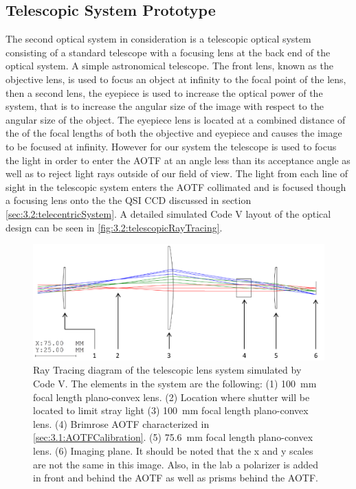 \subsection{Telescopic System Prototype}

The second optical system in consideration is a telescopic optical system consisting of a standard telescope with a focusing lens at the back end of the optical system. A simple astronomical telescope. The front lens, known as the objective lens, is used to focus an object at infinity to the focal point of the lens, then a second lens, the eyepiece is used to increase the optical power of the system, that is to increase the angular size of the image with respect to the angular size of the object. The eyepiece lens is located at a combined distance of the of the focal lengths of both the objective and eyepiece and causes the image to be focused at infinity. However for our system the telescope is used to focus the light in order to enter the AOTF at an angle less than its acceptance angle as well as to reject light rays outside of our field of view. The light from each line of sight in the telescopic system enters the AOTF collimated and is focused though a focusing lens onto the the QSI CCD discussed in section \autoref{sec:3.2:telecentricSystem}. A detailed simulated Code V layout of the optical design can be seen in \autoref{fig:3.2:telescopicRayTracing}.




\begin{figure}
    \includegraphics[width=1.0\textwidth]{./Images/3-2-TelescopicRayTracing.pdf}
    \caption[ALI Telescopic Design Prototype]{Ray Tracing diagram of the telescopic lens system simulated by Code V. The elements in the system are the following: (1) 100~mm focal length plano-convex lens. (2) Location where shutter will be located to limit stray light (3) 100~mm focal length plano-convex lens. (4) Brimrose AOTF characterized in \autoref{sec:3.1:AOTFCalibration}. (5) 75.6~mm focal length plano-convex lens. (6) Imaging plane. It should be noted that the x and y scales are not the same in this image. Also, in the lab a polarizer is added in front and behind the AOTF as well as prisms behind the AOTF.}
    \label{fig:3.2:telescopicRayTracing}
\end{figure}

